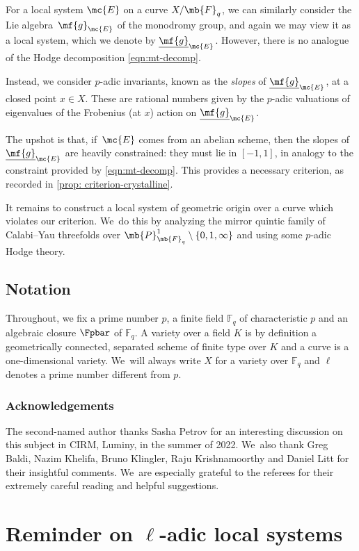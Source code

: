 For a local system $\mc{E}$ on a curve $X/\mb{F}_q$, we can similarly consider the Lie algebra~$\mf{g}_{\mc{E}}$ of the monodromy group, and again we may view it as a local system, which we denote by $\underline{\mf{g}}_{\mc{E}}$. However, there is no analogue of the Hodge decomposition \eqref{eqn:mt-decomp}.

Instead, we consider $p$-adic invariants, known as the \emph{slopes} of $\underline{\mf{g}}_{\mc{E}}$, at a closed point $x\in X$. These are rational numbers given by the $p$-adic valuations of eigenvalues of the Frobenius (at $x$) action on $\underline{\mf{g}}_{\mc{E}}$.

The upshot is that, if~$\mc{E}$ comes from an abelian scheme, then the slopes of $\underline{\mf{g}}_{\mc{E}}$ are heavily constrained: they must lie in $[-1, 1]$, in analogy to the constraint provided by \eqref{eqn:mt-decomp}. This provides a necessary criterion, as recorded in \cref{prop: criterion-crystalline}.

It remains to construct a local system of geometric origin over a curve which violates our criterion. We~do this by analyzing the mirror quintic family of Calabi--Yau threefolds over $\mb{P}^1_{\mb{F}_q}\setminus \{0,1,\infty\}$ and using some $p$-adic Hodge theory.

\subsection{Notation}
Throughout, we fix a prime number $p$, a finite field $\mathbb{F}_q$ of characteristic $p$ and an algebraic closure $\Fpbar$ of $\mathbb{F}_q$. A variety over a field $K$ is by definition a geometrically connected, separated scheme of finite type over $K$ and a curve is a one-dimensional variety. We~will always write $X$ for a variety over $\mathbb{F}_q$ and $\ell$ denotes a prime number different from $p$.

\subsubsection*{Acknowledgements}
The second-named author thanks Sasha Petrov for an interesting discussion on this subject in CIRM, Luminy, in the summer of 2022. We~also thank Greg Baldi, Nazim Khelifa, Bruno Klingler, Raju Krishnamoorthy and Daniel Litt for their insightful comments. We~are especially grateful to the referees for their extremely careful reading and helpful suggestions.

\section{Reminder on \texorpdfstring{$\ell$}{l}-adic local systems}\label{sec: coefficient}

